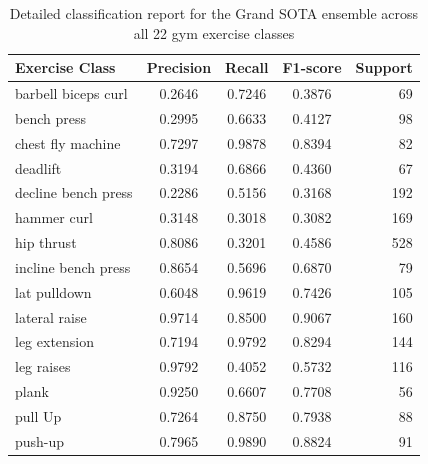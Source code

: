 \documentclass[runningheads]{llncs}
\begin{document}
\begin{table}[!h]
\centering
\caption{Detailed classification report for the Grand SOTA ensemble across all 22 gym exercise classes}
\label{tab:stacking-report}
\begin{tabular}{l c c c r}
\hline
\textbf{Exercise Class}   & \textbf{Precision} & \textbf{Recall} & \textbf{F1-score} & \textbf{Support} \\
\hline
barbell biceps curl       & 0.2646             & 0.7246          & 0.3876            & 69               \\
bench press               & 0.2995             & 0.6633          & 0.4127            & 98               \\
chest fly machine         & 0.7297             & 0.9878          & 0.8394            & 82               \\
deadlift                  & 0.3194             & 0.6866          & 0.4360            & 67               \\
decline bench press       & 0.2286             & 0.5156          & 0.3168            & 192              \\
hammer curl               & 0.3148             & 0.3018          & 0.3082            & 169              \\
hip thrust                & 0.8086             & 0.3201          & 0.4586            & 528              \\
incline bench press       & 0.8654             & 0.5696          & 0.6870            & 79               \\
lat pulldown              & 0.6048             & 0.9619          & 0.7426            & 105              \\
lateral raise             & 0.9714             & 0.8500          & 0.9067            & 160              \\
leg extension             & 0.7194             & 0.9792          & 0.8294            & 144              \\
leg raises                & 0.9792             & 0.4052          & 0.5732            & 116              \\
plank                     & 0.9250             & 0.6607          & 0.7708            & 56               \\
pull Up                   & 0.7264             & 0.8750          & 0.7938            & 88               \\
push-up                   & 0.7965             & 0.9890          & 0.8824            & 91               \\

\end{tabular}
\end{table}
\end{document}
